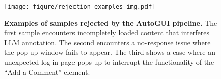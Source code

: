 \begin{figure}[th]
    \centering
    \texttt{[image: figure/rejection\_examples\_img.pdf]}
    \caption{\textbf{Examples of samples rejected by the AutoGUI pipeline.} The first sample encounters incompletely loaded content that interferes LLM annotation. The second encounters a no-response issue where the pop-up window fails to appear. The third shows a case where an unexpected log-in page pops up to interrupt the functionality of the ``Add a Comment'' element.}
    \label{fig: rejection examples}
\end{figure}
